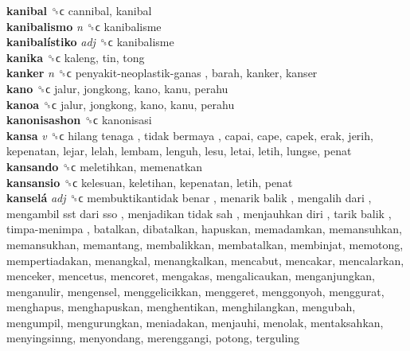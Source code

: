 \textbf{kanibal} ␝ϲ  cannibal, kanibal  \\
\textbf{kanibalismo} \emph{n}  ␝ϲ  kanibalisme  \\
\textbf{kanibalístiko} \emph{adj}  ␝ϲ  kanibalisme  \\
\textbf{kanika} ␝ϲ  kaleng, tin, tong  \\
\textbf{kanker} \emph{n}  ␝ϲ   penyakit-neoplastik-ganas , barah, kanker, kanser  \\
\textbf{kano} ␝ϲ  jalur, jongkong, kano, kanu, perahu  \\
\textbf{kanoa} ␝ϲ  jalur, jongkong, kano, kanu, perahu  \\
\textbf{kanonisashon} ␝ϲ  kanonisasi  \\
\textbf{kansa} \emph{v}  ␝ϲ   hilang tenaga ,  tidak bermaya , capai, cape, capek, erak, jerih, kepenatan, lejar, lelah, lembam, lenguh, lesu, letai, letih, lungse, penat  \\
\textbf{kansando} ␝ϲ  meletihkan, memenatkan  \\
\textbf{kansansio} ␝ϲ  kelesuan, keletihan, kepenatan, letih, penat  \\
\textbf{kanselá} \emph{adj}  ␝ϲ   membuktikantidak benar ,  menarik balik ,  mengalih dari ,  mengambil sst dari sso ,  menjadikan tidak sah ,  menjauhkan diri ,  tarik balik ,  timpa-menimpa , batalkan, dibatalkan, hapuskan, memadamkan, memansuhkan, memansukhan, memantang, membalikkan, membatalkan, membinjat, memotong, mempertiadakan, menangkal, menangkalkan, mencabut, mencakar, mencalarkan, menceker, mencetus, mencoret, mengakas, mengalicaukan, menganjungkan, menganulir, mengensel, menggelicikkan, menggeret, menggonyoh, menggurat, menghapus, menghapuskan, menghentikan, menghilangkan, mengubah, mengumpil, mengurungkan, meniadakan, menjauhi, menolak, mentaksahkan, menyingsinng, menyondang, merenggangi, potong, terguling  \\
